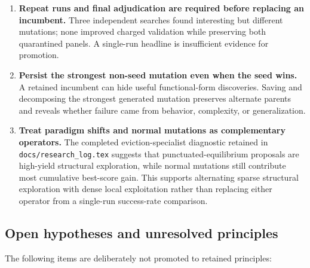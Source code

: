 \documentclass[11pt]{article}
\newcommand{\filepath}[1]{\nolinkurl{#1}}
\begin{document}
\begin{enumerate}
  \item \textbf{Repeat runs and final adjudication are required before replacing an
  incumbent.}  Three independent searches found interesting but different mutations;
  none improved charged validation while preserving both quarantined panels.  A
  single-run headline is insufficient evidence for promotion.

  \item \textbf{Persist the strongest non-seed mutation even when the seed wins.}  A
  retained incumbent can hide useful functional-form discoveries.  Saving and
  decomposing the strongest generated mutation preserves alternate parents and reveals
  whether failure came from behavior, complexity, or generalization.

  \item \textbf{Treat paradigm shifts and normal mutations as complementary operators.}
  The completed eviction-specialist diagnostic retained in
  \filepath{docs/research_log.tex} suggests that punctuated-equilibrium proposals
  are high-yield structural exploration, while normal mutations still contribute most
  cumulative best-score gain.  This supports
  alternating sparse structural exploration with dense local exploitation rather than
  replacing either operator from a single-run success-rate comparison.
\end{enumerate}

\subsection{Open hypotheses and unresolved principles}

The following items are deliberately not promoted to retained principles:
\end{document}

